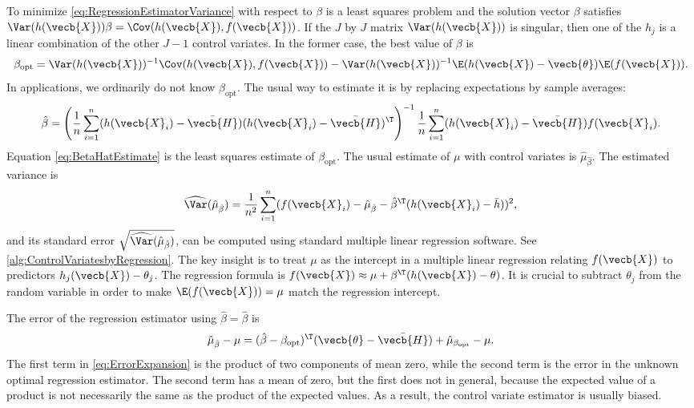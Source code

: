 To minimize \cref{eq:RegressionEstimatorVariance} with respect to $\beta$ is a least squares problem and the solution vector $\beta$ satisfies $\Var(h(\vecb{X}))\beta = \Cov(h(\vecb{X}), f(\vecb{X}))$. If the $J$ by $J$ matrix $\Var(h(\vecb{X}))$ is singular, then one of the $h_j$ is a linear combination of the other $J-1$ control variates. In the former case, the best value of $\beta$ is
\begin{equation}
	\beta_{\text{opt}} = \Var(h(\vecb{X}))^{-1} \Cov(h(\vecb{X}), f(\vecb{X})) - \Var(h(\vecb{X}))^{-1} \E(h(\vecb{X}) - \vecb{\theta}) \E(f(\vecb{X})).
	\label{eq:BetaOptMatrix}
\end{equation}
In applications, we ordinarily do not know $\beta_{\text{opt}}$. The usual way to estimate it is by replacing expectations by sample averages:
\begin{equation}
	\hat{\beta} = \left(\frac{1}{n} \sum_{i=1}^n (h(\vecb{X}_i) - \bar{\vecb{H}}) (h(\vecb{X}_i) - \bar{\vecb{H}})^{\T}\right)^{-1} \frac{1}{n} \sum_{i=1}^n (h(\vecb{X}_i) - \bar{\vecb{H}}) f(\vecb{X}_i).
	\label{eq:BetaHatEstimate}
\end{equation}
Equation \cref{eq:BetaHatEstimate} is the least squares estimate of $\beta_{\text{opt}}$. The usual estimate of $\mu$ with control variates is $\hat{\mu}_{\hat{\beta}}$. The estimated variance is
\begin{equation}
	\widehat{\Var}(\hat{\mu}_{\hat{\beta}}) = \frac{1}{n^2} \sum_{i=1}^n (f(\vecb{X}_i) - \hat{\mu}_{\hat{\beta}} - \hat{\beta}^{\T} (h(\vecb{X}_i) - \bar{h}))^2,
	\label{eq:EstimatedVarianceBeta}
\end{equation}
and its standard error $\sqrt{\widehat{\Var}(\hat{\mu}_{\hat{\beta}})}$, can be computed using standard multiple linear regression software. See \cref{alg:ControlVariatesbyRegression}. The key insight is to treat $\mu$ as the intercept in a multiple linear regression relating $f(\vecb{X})$ to predictors $h_j(\vecb{X}) - \theta_j$. The regression formula is $f(\vecb{X}) \approx \mu + \beta^{\T} (h(\vecb{X}) - \theta)$. It is crucial to subtract $\theta_j$ from the random variable in order to make $\E(f(\vecb{X})) = \mu$ match the regression intercept.

The error of the regression estimator using $\hat{\beta} = \hat{\beta}$ is
\begin{equation}
	\hat{\mu}_{\hat{\beta}} - \mu = (\hat{\beta} - \beta_{\text{opt}})^{\T}(\vecb{\theta} - \bar{\vecb{H}}) + \hat{\mu}_{\beta_{\text{opt}}} - \mu.
	\label{eq:ErrorExpansion}
\end{equation}
The first term in \cref{eq:ErrorExpansion} is the product of two components of mean zero, while the second term is the error in the unknown optimal regression estimator. The second term has a mean of zero, but the first does not in general, because the expected value of a product is not necessarily the same as the product of the expected values. As a result, the control variate estimator is usually biased.

